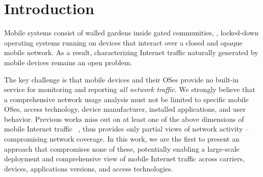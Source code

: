 \section{Introduction}
\label{sec:introduction}

Mobile systems consist of walled gardens inside gated communities, \ie{}, locked-down operating systems running on devices that interact over a closed and opaque mobile network. 
As a result, characterizing Internet traffic naturally generated by mobile devices remains an open problem. 

The key challenge is that mobile devices and their OSes provide no built-in service for monitoring and reporting \emph{all network traffic}. 
We strongly believe that a comprehensive network usage analysis must not be limited to specific mobile OSes, access technology, device manufacturer, installed applications, and user behavior. 
Previous works miss out on at least one of the above dimensions of mobile Internet traffic ~\cite{anyattstudy, wifistudy,mobilelab,mobiperf}, thus provides only partial views of network activity -- compromising network coverage. 
In this work, we are the first to present an approach that compromises none of these, potentially enabling a large-scale deployment and comprehensive view of  mobile Internet traffic across carriers, devices, applications versions, and access technologies.



